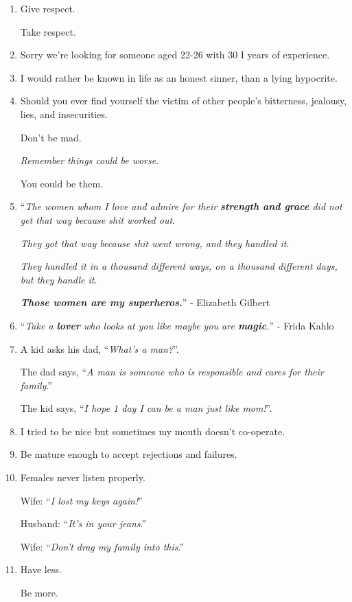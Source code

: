 \documentclass{article}
\numberwithin{equation}{section}
\begin{document}
\begin{enumerate}
    It's about who stays loyal behind your back.
    \item Give respect.
    
    Take respect.
    \item Sorry we're looking for someone aged 22-26 with 30 I years of experience.
    \item I would rather be known in life as an honest sinner, than a lying hypocrite.
    \item Should you ever find yourself the victim of other people's bitterness, jealousy, lies, and insecurities.
    
    Don't be mad.
    
    \textit{Remember things could be worse}.
    
    You could be them.
    \item ``\textit{The women whom I love and admire for their \textbf{strength and grace} did not get that way because shit worked out}.
    
    \textit{They got that way because shit went wrong, and they handled it}.
    
    \textit{They handled it in a thousand different ways, on a thousand different days, but they handle it}.
    
    \textbf{\textit{Those women are my superheros}.}'' - Elizabeth Gilbert
    \item ``\textit{Take a \textbf{lover} who looks at you like maybe you are \textbf{magic}.}'' - Frida Kahlo
    \item A kid asks his dad, ``\textit{What's a man?}''.
    
    The dad says, ``\textit{A man is someone who is responsible and cares for their family}.''
    
    The kid says, ``\textit{I hope 1 day I can be a man just like mom!}''.
    \item I tried to be nice but sometimes my mouth doesn't co-operate.
    \item Be mature enough to accept rejections and failures.
    \item Females never listen properly.
    
    Wife: ``\textit{I lost my keys again!}''
    
    Husband: ``\textit{It's in your jeans}.''
    
    Wife: ``\textit{Don't drag my family into this}.''
    \item Have less.
    
    Be more.
    

\end{enumerate}
\end{document}
